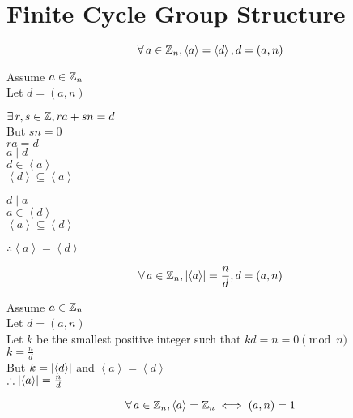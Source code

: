 \documentclass[letterpaper,12pt,fleqn]{article}
\newcommand{\cycle}[1]{\left<#1\right>}
\begin{document}
\section*{Finite Cycle Group Structure}

\begin{theorem}
  \listbreak
  \[\forall\,a\in\Z_n,\cycle{a}=\cycle{d},d=(a,n)\]
\end{theorem}

\begin{theproof}
  Assume $a\in\mathbb{Z}_n$ \\
  Let $d=(a,n)$ \\

  \begin{minipage}[t]{3in}
    $\exists\,r,s\in\mathbb{Z},ra+sn=d$ \\
    But $sn=0$ \\
    $ra=d$ \\
    $a\mid d$ \\
    $d\in\cycle{a}$ \\
    $\cycle{d}\subseteq\cycle{a}$
  \end{minipage}
  \begin{minipage}[t]{3in}
    $d\mid a$ \\
    $a\in\cycle{d}$ \\
    $\cycle{a}\subseteq\cycle{d}$
  \end{minipage}

  \bigskip
  
  $\therefore\cycle{a}=\cycle{d}$ \\
\end{theproof}

\begin{corollary}
  \listbreak
  \[\forall\,a\in\Z_n,\abs{\cycle{a}}=\frac{n}{d},d=(a,n)\]
\end{corollary}

\begin{theproof}
  Assume $a\in\mathbb{Z}_n$ \\
  Let $d=(a,n)$ \\
  Let $k$ be the smallest positive integer such that $kd=n=0\pmod{n}$ \\
  $k=\frac{n}{d}$ \\
  But $k=\abs{\cycle{d}}$ and $\cycle{a}=\cycle{d}$ \\
  $\therefore\abs{\cycle{a}}=\frac{n}{d}$
\end{theproof}

\begin{corollary}
  \listbreak
  \[\forall\,a\in\Z_n,\cycle{a}=\Z_n\iff(a,n)=1\]
\end{corollary}
\end{document}
